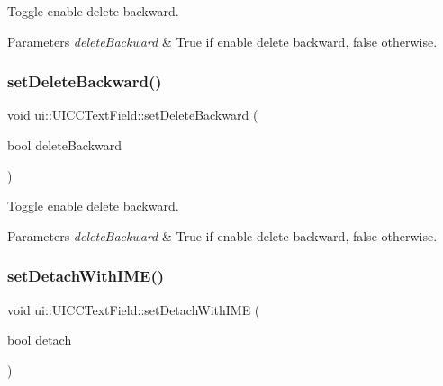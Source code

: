 Toggle enable delete backward. 


\begin{DoxyParams}{Parameters}
{\em delete\+Backward} & True if enable delete backward, false otherwise. \\
\hline
\end{DoxyParams}
\mbox{\label{classui_1_1UICCTextField_a023e1be2c42fac0ee7a1997885b5763d}} 
\subsubsection{\texorpdfstring{set\+Delete\+Backward()}{setDeleteBackward()}\hspace{0.1cm}{\footnotesize\ttfamily [2/2]}}
{\footnotesize\ttfamily void ui\+::\+U\+I\+C\+C\+Text\+Field\+::set\+Delete\+Backward (\begin{DoxyParamCaption}\item[{bool}]{delete\+Backward }\end{DoxyParamCaption})}



Toggle enable delete backward. 


\begin{DoxyParams}{Parameters}
{\em delete\+Backward} & True if enable delete backward, false otherwise. \\
\hline
\end{DoxyParams}
\mbox{\label{classui_1_1UICCTextField_a93a1fd10bfd3f6547045320b605f8987}} 
\subsubsection{\texorpdfstring{set\+Detach\+With\+I\+M\+E()}{setDetachWithIME()}\hspace{0.1cm}{\footnotesize\ttfamily [1/2]}}
{\footnotesize\ttfamily void ui\+::\+U\+I\+C\+C\+Text\+Field\+::set\+Detach\+With\+I\+ME (\begin{DoxyParamCaption}\item[{bool}]{detach }\end{DoxyParamCaption})}



